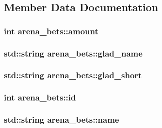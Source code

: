 \subsection{Member Data Documentation}
\hypertarget{classarena__bets_ac225ff8523480dcbf67fdf701d9ce747}{
\subsubsection[{amount}]{\setlength{\rightskip}{0pt plus 5cm}int arena\-\_\-bets\-::amount}}\label{classarena__bets_ac225ff8523480dcbf67fdf701d9ce747}
\hypertarget{classarena__bets_abcbf06b48b74f2fe506448b4aff23055}{
\subsubsection[{glad\-\_\-name}]{\setlength{\rightskip}{0pt plus 5cm}std\-::string arena\-\_\-bets\-::glad\-\_\-name}}\label{classarena__bets_abcbf06b48b74f2fe506448b4aff23055}
\hypertarget{classarena__bets_a3418818e2a0af7cd69c8b923f9f009e7}{
\subsubsection[{glad\-\_\-short}]{\setlength{\rightskip}{0pt plus 5cm}std\-::string arena\-\_\-bets\-::glad\-\_\-short}}\label{classarena__bets_a3418818e2a0af7cd69c8b923f9f009e7}
\hypertarget{classarena__bets_aa44079288ae2a5b61d87f586cf9a82b9}{
\subsubsection[{id}]{\setlength{\rightskip}{0pt plus 5cm}int arena\-\_\-bets\-::id}}\label{classarena__bets_aa44079288ae2a5b61d87f586cf9a82b9}
\hypertarget{classarena__bets_a57dd9342f27f9bcae1de156a00d5eb4d}{
\subsubsection[{name}]{\setlength{\rightskip}{0pt plus 5cm}std\-::string arena\-\_\-bets\-::name}}\label{classarena__bets_a57dd9342f27f9bcae1de156a00d5eb4d}
